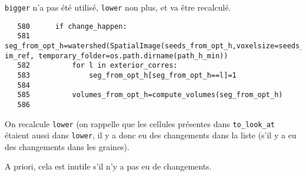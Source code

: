 \documentclass{article}
\def \mycolor {red}
\begin{document}
\verb|bigger| n'a pas \'et\'e utilis\'e, \verb|lower| non plus, et va \^etre recalcul\'e.
\color{black}
\begin{verbatim}
   580	    if change_happen:
   581	        seg_from_opt_h=watershed(SpatialImage(seeds_from_opt_h,voxelsize=seeds_from_opt_h.voxelsize), im_ref, temporary_folder=os.path.dirname(path_h_min))
   582	        for l in exterior_corres:
   583	            seg_from_opt_h[seg_from_opt_h==l]=1  
   584	            
   585	        volumes_from_opt_h=compute_volumes(seg_from_opt_h)
   586	
\end{verbatim} 
\color{\mycolor}
On recalcule \verb|lower| (on rappelle que les cellules pr\'esentes dans \verb|to_look_at| \'etaient aussi dans \verb|lower|, il y a donc eu des changements dans la liste (s'il y a eu des changements dans les graines).

A priori, cela est inutile s'il n'y a pas eu de changements.
\end{document}

